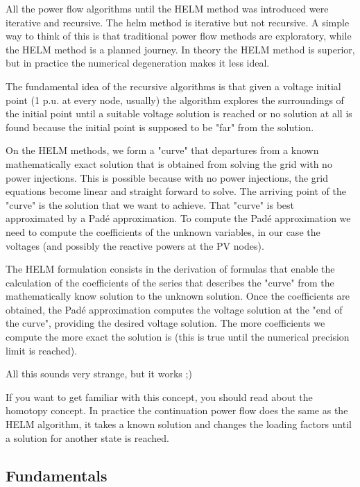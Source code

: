 \documentclass[nols,a4paper,twoside,notoc,fleqn]{tufte-book}
\begin{document}
All the power flow algorithms until the HELM method was introduced were iterative and recursive. The helm method is iterative but not recursive. A simple way to think of this is that traditional power flow methods are exploratory, while the HELM method is a planned journey. In theory the HELM method is superior, but in practice the numerical degeneration makes it less ideal.

The fundamental idea of the recursive algorithms is that given a voltage initial point (1 p.u. at every node, usually) the algorithm explores the surroundings of the initial point until a suitable voltage solution is reached or no solution at all is found because the initial point is supposed to be "far" from the solution.

On the HELM methods, we form a "curve" that departures from a known mathematically exact solution that is obtained from solving the grid with no power injections. This is possible because with no power injections, the grid equations become linear and straight forward to solve. The arriving point of the "curve" is the solution that we want to achieve. That "curve" is best approximated by a Pad\'e approximation. To compute the Pad\'e approximation we need to compute the coefficients of the unknown variables, in our case the voltages (and possibly the reactive powers at the PV nodes).

The HELM formulation consists in the derivation of formulas that enable the calculation of the coefficients of the series that describes the "curve" from the mathematically know solution to the unknown solution. Once the coefficients are obtained, the Pad\'e approximation computes the voltage solution at the "end of the curve", providing the desired voltage solution. The more coefficients we compute the more exact the solution is (this is true until the numerical precision limit is reached).\newline 


All this sounds very strange, but it works ;)\newline 


If you want to get familiar with this concept, you should read about the homotopy concept. In practice the continuation power flow does the same as the HELM algorithm, it takes a known solution and changes the loading factors until a solution for another state is reached.

\subsection{Fundamentals} \label{helm_fundamentals}
\end{document}
